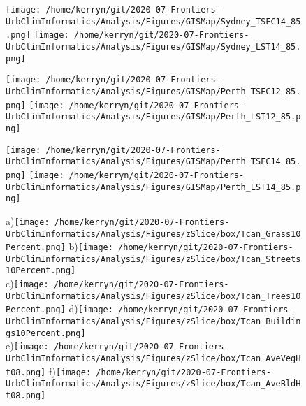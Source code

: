 \documentclass{article}
\begin{document}
\begin{figure}
\centering    
\texttt{[image: /home/kerryn/git/2020-07-Frontiers-UrbClimInformatics/Analysis/Figures/GISMap/Sydney\_TSFC14\_85.png]}
\texttt{[image: /home/kerryn/git/2020-07-Frontiers-UrbClimInformatics/Analysis/Figures/GISMap/Sydney\_LST14\_85.png]}
\end{figure} 
\clearpage




\begin{figure}
\centering    
\texttt{[image: /home/kerryn/git/2020-07-Frontiers-UrbClimInformatics/Analysis/Figures/GISMap/Perth\_TSFC12\_85.png]}
\texttt{[image: /home/kerryn/git/2020-07-Frontiers-UrbClimInformatics/Analysis/Figures/GISMap/Perth\_LST12\_85.png]}
\end{figure} 
\clearpage


\begin{figure}
\centering    
\texttt{[image: /home/kerryn/git/2020-07-Frontiers-UrbClimInformatics/Analysis/Figures/GISMap/Perth\_TSFC14\_85.png]}
\texttt{[image: /home/kerryn/git/2020-07-Frontiers-UrbClimInformatics/Analysis/Figures/GISMap/Perth\_LST14\_85.png]}
\end{figure} 
\clearpage



\begin{figure}
\centering    
a)\texttt{[image: /home/kerryn/git/2020-07-Frontiers-UrbClimInformatics/Analysis/Figures/zSlice/box/Tcan\_Grass10Percent.png]}
b)\texttt{[image: /home/kerryn/git/2020-07-Frontiers-UrbClimInformatics/Analysis/Figures/zSlice/box/Tcan\_Streets10Percent.png]}\\
c)\texttt{[image: /home/kerryn/git/2020-07-Frontiers-UrbClimInformatics/Analysis/Figures/zSlice/box/Tcan\_Trees10Percent.png]}
d)\texttt{[image: /home/kerryn/git/2020-07-Frontiers-UrbClimInformatics/Analysis/Figures/zSlice/box/Tcan\_Buildings10Percent.png]}\\
e)\texttt{[image: /home/kerryn/git/2020-07-Frontiers-UrbClimInformatics/Analysis/Figures/zSlice/box/Tcan\_AveVegHt08.png]}
f)\texttt{[image: /home/kerryn/git/2020-07-Frontiers-UrbClimInformatics/Analysis/Figures/zSlice/box/Tcan\_AveBldHt08.png]}
\end{figure} 
\clearpage
\end{document}
